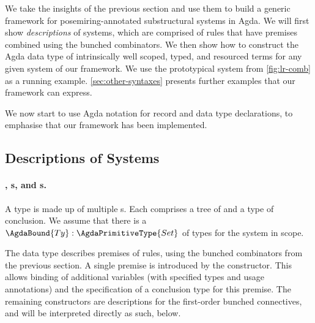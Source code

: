 We take the insights of the previous section and use them to build a
generic framework for posemiring-annotated substructural systems in
Agda. We will first show \emph{descriptions} of systems, which are
comprised of rules that have premises combined using the bunched
combinators. We then show how to construct the Agda data type of
intrinsically well scoped, typed, and resourced terms for any given
system of our framework. We use the prototypical system from
\cref{fig:lr-comb} as a running example. \cref{sec:other-syntaxes}
presents further examples that our framework can express.

We now start to use Agda notation for record and data type
declarations, to emphasise that our framework has been implemented.

\subsection{Descriptions of Systems}


\paragraph{, s, and s.}

A type  is made up of multiple s.
Each  comprises a tree of  and
a type of conclusion. We assume that there is a
$\AgdaBound{Ty} : \AgdaPrimitiveType{Set}$ of types for the system in
scope.

The  data type describes premises of rules,
using the bunched combinators from the previous section. A single
premise is introduced by the
constructor.  This allows binding of additional variables
\AgdaBound{$\Delta$} (with specified types and usage annotations) and
the specification of a conclusion type  for this premise.
The remaining constructors are descriptions for the first-order
bunched connectives, and will be interpreted directly as such, below.


